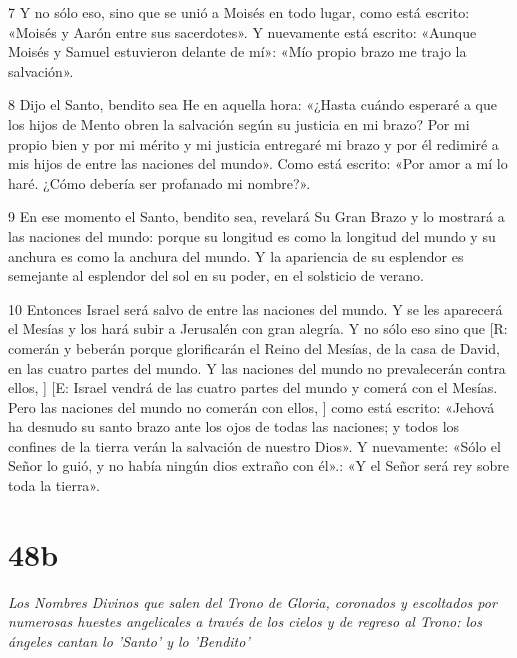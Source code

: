 \par 7 Y no sólo eso, sino que se unió a Moisés en todo lugar, como está escrito: «Moisés y Aarón entre sus sacerdotes». Y nuevamente está escrito: «Aunque Moisés y Samuel estuvieron delante de mí»: «Mío propio brazo me trajo la salvación».

\par 8 Dijo el Santo, bendito sea He en aquella hora: «¿Hasta cuándo esperaré a que los hijos de Mento obren la salvación según su justicia en mi brazo? Por mi propio bien y por mi mérito y mi justicia entregaré mi brazo y por él redimiré a mis hijos de entre las naciones del mundo». Como está escrito: «Por amor a mí lo haré. ¿Cómo debería ser profanado mi nombre?».

\par 9 En ese momento el Santo, bendito sea, revelará Su Gran Brazo y lo mostrará a las naciones del mundo: porque su longitud es como la longitud del mundo y su anchura es como la anchura del mundo. Y la apariencia de su esplendor es semejante al esplendor del sol en su poder, en el solsticio de verano.

\par 10 Entonces Israel será salvo de entre las naciones del mundo. Y se les aparecerá el Mesías y los hará subir a Jerusalén con gran alegría. Y no sólo eso sino que [R: comerán y beberán porque glorificarán el Reino del Mesías, de la casa de David, en las cuatro partes del mundo. Y las naciones del mundo no prevalecerán contra ellos, ] [E: Israel vendrá de las cuatro partes del mundo y comerá con el Mesías. Pero las naciones del mundo no comerán con ellos, ] como está escrito: «Jehová ha desnudo su santo brazo ante los ojos de todas las naciones; y todos los confines de la tierra verán la salvación de nuestro Dios». Y nuevamente: «Sólo el Señor lo guió, y no había ningún dios extraño con él».: «Y el Señor será rey sobre toda la tierra».



\chapter{48b}

\par \textit{Los Nombres Divinos que salen del Trono de Gloria, coronados y escoltados por numerosas huestes angelicales a través de los cielos y de regreso al Trono: los ángeles cantan lo 'Santo' y lo 'Bendito'}

